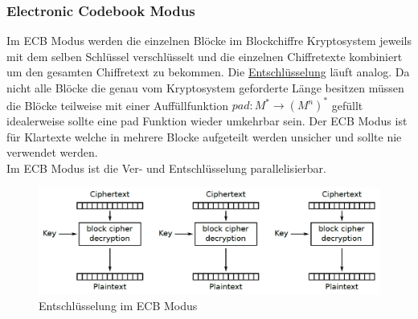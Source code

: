 \documentclass[a4paper,12pt,leqno]{article}
\begin{document}
\subsubsection{Electronic Codebook Modus}
Im ECB Modus werden die einzelnen Blöcke im Blockchiffre Kryptosystem jeweils mit dem selben Schlüssel verschlüsselt und die einzelnen Chiffretexte kombiniert um den gesamten Chiffretext zu bekommen. Die \hyperref[pic:ECBModus]{Entschlüsselung} läuft analog.
Da nicht alle Blöcke die genau vom Kryptosystem geforderte Länge besitzen müssen die Blöcke teilweise mit einer Auffüllfunktion $pad: M^*\rightarrow (M^n)^*$ gefüllt idealerweise sollte eine pad Funktion wieder umkehrbar sein.
Der ECB Modus ist für Klartexte welche in mehrere Blocke aufgeteilt werden unsicher und sollte nie verwendet werden.\\
Im ECB Modus ist die Ver- und Entschlüsselung parallelisierbar.

\begin{figure}
\centering
\includegraphics[scale=0.5]{Grafiken/ECBModus.png}
\caption{Entschlüsselung im ECB Modus}
\label{pic:ECBModus}
\end{figure}
\end{document}
